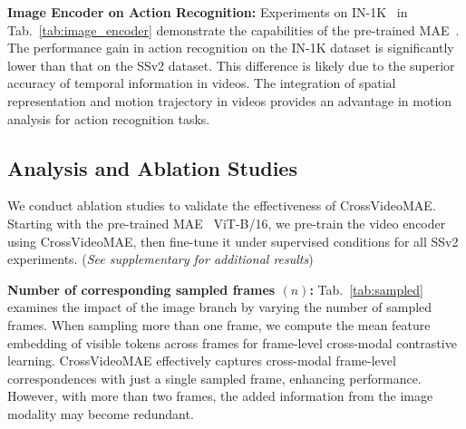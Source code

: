 \begin{table}[h!]
\vspace{-5pt}
\centering
\scriptsize
{}
\vspace{-5pt}
\captionsetup{font=footnotesize}
\caption{Performance on 1N-1K and SSv2 datasets when combining pre-trained MAE and SpatioTemporalMAE with contrastive learning.}
\label{tab:image_encoder}
\vspace{-10pt}
\end{table}

\noindent \textbf{Image Encoder on Action Recognition:} Experiments on IN-1K~\cite{deng2009imagenet} in Tab.~\ref{tab:image_encoder} demonstrate the capabilities of the pre-trained MAE~\cite{he2022masked}. The performance gain in action recognition on the IN-1K dataset is significantly lower than that on the SSv2 dataset. This difference is likely due to the superior accuracy of temporal information in videos. The integration of spatial representation and motion trajectory in videos provides an advantage in motion analysis for action recognition tasks.

\subsection{Analysis and Ablation Studies}



We conduct ablation studies to validate the effectiveness of CrossVideoMAE. Starting with the pre-trained MAE~\cite{he2022masked} ViT-B/16, we pre-train the video encoder using CrossVideoMAE, then fine-tune it under supervised conditions for all SSv2 experiments. (\textit{See supplementary for additional results})

\noindent\textbf{Number of corresponding sampled frames $(n)$:} 
Tab.~\ref{tab:sampled} examines the impact of the image branch by varying the number of sampled frames. When sampling more than one frame, we compute the mean feature embedding of visible tokens across frames for frame-level cross-modal contrastive learning. CrossVideoMAE effectively captures cross-modal frame-level correspondences with just a single sampled frame, enhancing performance. However, with more than two frames, the added information from the image modality may become redundant.

